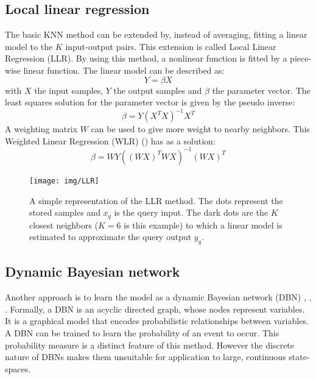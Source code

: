 \documentclass[a4paper,11pt]{mscLiterature}
\begin{document}
\subsection{Local linear regression}
The basic KNN method can be extended by, instead of averaging, fitting a linear model to the $K$ input-output pairs. This extension is called Local Linear Regression (LLR). By using this method, a nonlinear function is fitted by a piece-wise linear function. The linear model can be described as:
\begin{equation}
	Y = \beta X
\end{equation}
with $X$ the input samples, $Y$ the output samples and $\beta$ the parameter vector. The least squares solution for the parameter vector is given by the pseudo inverse:
\begin{equation}
	\beta = Y \left( X^T X \right)^{-1} X^T
\end{equation}
A weighting matrix $W$ can be used to give more weight to nearby neighbors. This Weighted Linear Regression (WLR) (\cite{SchaalAtkeson:95}) has as a solution:
\begin{equation}
	\beta = WY \left( (WX)^T WX \right)^{-1} (WX)^T
\end{equation}
\begin{figure}[htbp]
	\centering
		\texttt{[image: img/LLR]}
	\caption{A simple representation of the LLR method. The dots represent the stored samples and $x_q$ is the query input. The dark dots are the $K$ closest neighbors ($K=6$ is this example) to which a linear model is estimated to approximate the query output $y_q$.}
	\label{fig:LRR}
\end{figure}

\subsection{Dynamic Bayesian network}
Another approach is to learn the model as a dynamic Bayesian network (DBN) \cite{Tadepalli:96}, \cite{FriedmanGoldxzmidt:97}, \cite{Heckerman:96}. Formally, a DBN is an acyclic directed graph, whose nodes represent variables. It is a graphical model that encodes probabilistic relationships between variables. A DBN can be trained to learn the probability of an event to occur. This probability measure is a distinct feature of this method. However the discrete nature of DBNs makes them unsuitable for application to large, continuous state-spaces.

\end{document}
